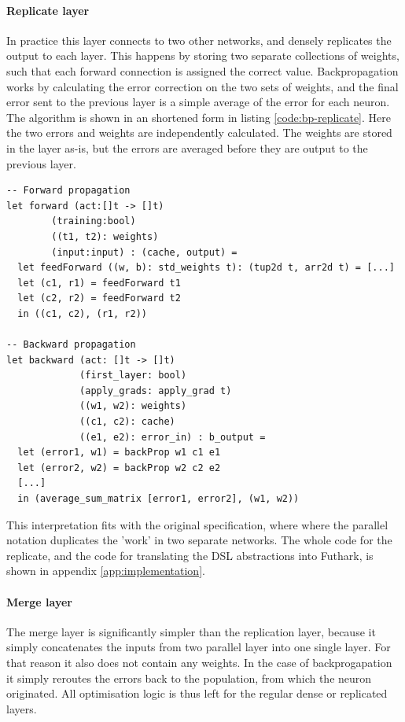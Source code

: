 \paragraph{Replicate layer}
In practice this layer connects to two other networks, and densely
replicates the output to each layer.
This happens by storing two separate collections of weights, such
that each forward connection is assigned the correct value.
Backpropagation works by calculating the error correction on the
two sets of weights, and the final error sent to the previous layer
is a simple average of the error for each neuron. 
The algorithm is shown in an shortened form in listing \ref{code:bp-replicate}.
Here the two errors and weights are independently calculated.
The weights are stored in the layer as-is, but the errors are 
averaged before they are output to the previous layer.

\lstset{language=,caption=Part of the forward and backward propagation algorithms for the replicate layer. Abbreviated for clarity.}
\begin{lstlisting}
-- Forward propagation
let forward (act:[]t -> []t)
	    (training:bool)
	    ((t1, t2): weights)
	    (input:input) : (cache, output) =
  let feedForward ((w, b): std_weights t): (tup2d t, arr2d t) = [...]
  let (c1, r1) = feedForward t1
  let (c2, r2) = feedForward t2
  in ((c1, c2), (r1, r2))

-- Backward propagation
let backward (act: []t -> []t)
             (first_layer: bool)
             (apply_grads: apply_grad t)
             ((w1, w2): weights)
             ((c1, c2): cache)
             ((e1, e2): error_in) : b_output =
  let (error1, w1) = backProp w1 c1 e1
  let (error2, w2) = backProp w2 c2 e2
  [...]
  in (average_sum_matrix [error1, error2], (w1, w2))
\end{lstlisting} \label{code:bp-replicate}

This interpretation fits with the original specification, where
where the parallel notation duplicates the 'work' in two separate 
networks.
The whole code for the replicate, and the code for translating the \gls{DSL}
abstractions into Futhark,  is shown in appendix 
\ref{app:implementation}.

\paragraph{Merge layer}
The merge layer is significantly simpler than the replication layer,
because it simply concatenates the inputs from two parallel layer into one single
layer. 
For that reason it also does not contain any weights.
In the case of backprogapation it simply reroutes the errors back to
the population, from which the neuron originated.
All optimisation logic is thus left for the regular dense or replicated
layers.

